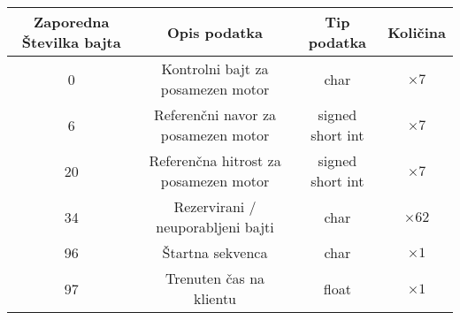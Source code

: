 
\begin{table}[h]
	\centering
	\begin{footnotesize}
		\begin{tabular}{|c c c c|}
		Zaporedna \v{S}tevilka bajta & Opis podatka & Tip podatka &  Koli\v{c}ina\\ \hline
		0 & Kontrolni bajt za posamezen motor & char & $\times 7$ \\
		6 & Referen\v{c}ni navor za posamezen motor & signed short int & $\times 7$ \\
		20 & Referen\v{c}na hitrost za posamezen motor & signed short int & $\times 7$ \\
		34 & Rezervirani / neuporabljeni bajti & char & $\times 62$ \\
		96 & \v{S}tartna sekvenca & char & $\times 1$\\
		97 & Trenuten \v{c}as na klientu & float & $\times 1$\\ \hline
		\end{tabular}
	\end{footnotesize}
	\label{table:udp-command}
\end{table}